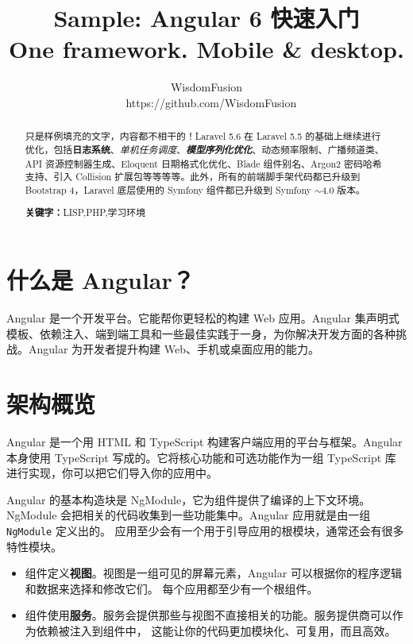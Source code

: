 \documentclass{../utils/progartcn}
\title{\bfseries\sffamily
  Sample: Angular 6 快速入门\\
  \normalfont\zihao{-3}
  One framework. Mobile \& desktop.
}
\author{WisdomFusion \\ \faGithubAlt~ https://github.com/WisdomFusion}
\date{}
\begin{document}
\sloppy %


\maketitle
\thispagestyle{empty}


\begin{abstract}
\noindent 只是样例填充的文字，内容都不相干的！Laravel 5.6 在 Laravel 5.5 的基础上继续进行优化，包括\textbf{日志系统}、\textit{单机任务调度}、\textbf{\textit{模型序列化优化}}、动态频率限制、广播频道类、API 资源控制器生成、Eloquent 日期格式化优化、Blade 组件别名、Argon2 密码哈希支持、引入 Collision 扩展包等等等等。此外，所有的前端脚手架代码都已升级到 Bootstrap 4，Laravel 底层使用的 Symfony 组件都已升级到 Symfony $\sim$4.0 版本。

\vspace{2ex}
\noindent \textbf{关键字：}LISP,\hspace{.5em}PHP,\hspace{.5em}学习环境
\end{abstract}

\section{什么是 Angular？}
\label{newfeatures}

Angular 是一个开发平台。它能帮你更轻松的构建 Web 应用。Angular 集声明式模板、依赖注入、端到端工具和一些最佳实践于一身，为你解决开发方面的各种挑战。Angular 为开发者提升构建 Web、手机或桌面应用的能力。

\section{架构概览}

Angular 是一个用 HTML 和 TypeScript 构建客户端应用的平台与框架。Angular 本身使用 TypeScript 写成的。它将核心功能和可选功能作为一组 TypeScript 库进行实现，你可以把它们导入你的应用中。

Angular 的基本构造块是 NgModule，它为组件提供了编译的上下文环境。 NgModule 会把相关的代码收集到一些功能集中。Angular 应用就是由一组 \verb|NgModule| 定义出的。 应用至少会有一个用于引导应用的根模块，通常还会有很多特性模块。

\begin{itemize}
  \item 组件定义\textbf{视图}。视图是一组可见的屏幕元素，Angular 可以根据你的程序逻辑和数据来选择和修改它们。 每个应用都至少有一个根组件。
  
  \item 组件使用\textbf{服务}。服务会提供那些与视图不直接相关的功能。服务提供商可以作为依赖被注入到组件中， 这能让你的代码更加模块化、可复用，而且高效。
\end{itemize}
\end{document}
